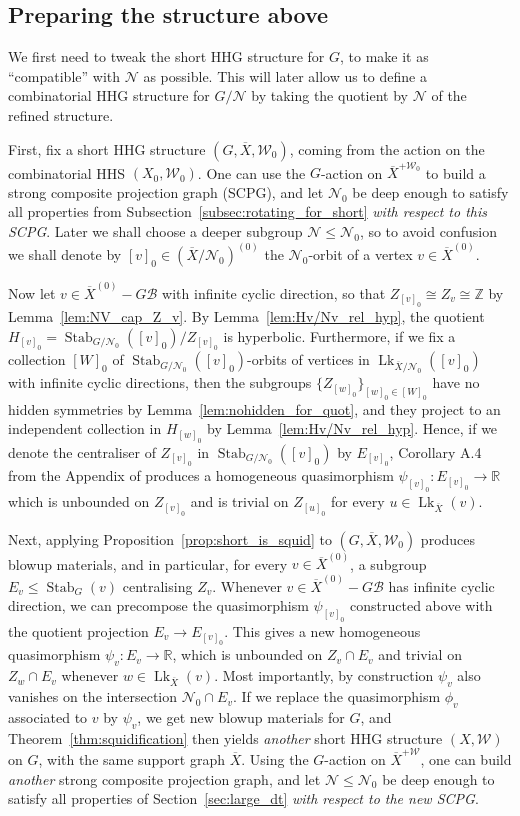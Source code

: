 \documentclass[svgnames]{amsart}
\theoremstyle{plain}
\theoremstyle{definition}
\newcommand{\Z}{\mathbb{Z}}
\newcommand{\R}{\mathbb{R}}
\newcommand{\ov}[1]{\overline{#1}}
\newcommand{\link}{\operatorname{Lk}}
\newcommand{\Stab}[2]{\operatorname{Stab}_{#1}(#2)}
\newcommand{\N}{\mathcal{N}}
\newcommand{\B}{\mathcal{B}}
\newcommand{\W}{\mathcal{W}}
\begin{document}
\subsection{Preparing the structure above}\label{subsec:preparation}
We first need to tweak the short HHG structure for $G$, to make it as “compatible” with $\N$ as possible. This will later allow us to define a combinatorial HHG structure for $G/\N$ by taking the quotient by $\N$ of the refined structure.
\par\medskip

First, fix a short HHG structure $(G,\ov X, \W_0)$, coming from the action on the combinatorial HHS $(X_0, \W_0)$. One can use the $G$-action on $\ov X^{+\W_0}$ to build a strong composite projection graph (SCPG), and let $\N_0$ be deep enough to satisfy all properties from Subsection~\ref{subsec:rotating_for_short} \emph{with respect to this SCPG}. Later we shall choose a deeper subgroup $\N\le \N_0$, so to avoid confusion we shall denote by $[v]_0\in (\ov X/\N_0)^{(0)}$ the $\N_0$-orbit of a vertex $v\in \ov X^{(0)}$. 

Now let $v\in \ov X^{(0)}-G\B$ with infinite cyclic direction, so that $Z_{[v]_0}\cong Z_v\cong \Z$ by Lemma~\ref{lem:NV_cap_Z_v}. By Lemma~\ref{lem:Hv/Nv_rel_hyp}, the quotient $H_{[v]_0}=\Stab{G/\N_0}{[v]_0}/Z_{[v]_0}$ is hyperbolic. Furthermore, if we fix a collection $[W]_0$ of $\Stab{G/\N_0}{[v]_0}$-orbits of vertices in $\link_{\ov X/\N_0}([v]_0)$ with infinite cyclic directions, then the subgroups $\{Z_{[w]_0}\}_{[w]_0\in [W]_0}$ have no hidden symmetries by Lemma~\ref{lem:nohidden_for_quot}, and they project to an independent collection in $H_{[w]_0}$ by Lemma~\ref{lem:Hv/Nv_rel_hyp}. Hence, if we denote the centraliser of $Z_{[v]_0}$ in $\Stab{G/\N_0}{[v]_0}$ by $E_{[v]_0}$, Corollary A.4 from the Appendix of \cite{Short_HHG:I}  produces a homogeneous quasimorphism $\psi_{[v]_0}\colon E_{[v]_0}\to \R$ which is unbounded on $Z_{[v]_0}$ and is trivial on $Z_{[u]_0}$ for every $u\in \link_{\ov X}(v)$. 

Next, applying Proposition~\ref{prop:short_is_squid} to $(G,\ov X, \W_0)$ produces blowup materials, and in particular, for every $v\in \ov X^{(0)}$, a subgroup $E_v\le \Stab{G}{v}$ centralising $Z_v$. Whenever $v\in \ov X^{(0)}-G\B$ has infinite cyclic direction, we can precompose the quasimorphism $\psi_{[v]_0}$ constructed above with the quotient projection $E_{v}\to E_{[v]_0}$. This gives a new homogeneous quasimorphism $\psi_{v}\colon E_{v}\to \mathbb{R}$, which is unbounded on $Z_{v}\cap E_{v}$ and trivial on $Z_w\cap E_{v}$ whenever $w\in\link_{\ov X}(v)$. Most importantly, by construction $\psi_{v}$ also vanishes on the intersection $\N_0\cap E_{v}$. If we replace the quasimorphism $\phi_v$ associated to $v$ by $\psi_v$, we get new blowup materials for $G$, and Theorem~\ref{thm:squidification} then yields \emph{another} short HHG structure $(X,\W)$ on $G$, with the same support graph $\ov X$. Using the $G$-action on $\ov X^{+\W}$, one can build \emph{another} strong composite projection graph, and let $\N\le \N_0$ be deep enough to satisfy all properties of Section~\ref{sec:large_dt} \emph{with respect to the new SCPG}.
\end{document}
